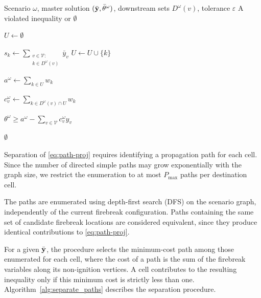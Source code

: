 \documentclass[a4paper,fleqn]{cas-sc}
\begin{document}
\begin{algorithm}[h]
\caption{Separation of \eqref{eq:coverage_projected}}
\label{alg:separate_coverage}
\begin{algorithmic}[1]
\Require Scenario $\omega$, master solution
$(\bar{\vb{y}},\bar\theta^\omega)$,
downstream sets $D^\omega(v)$, tolerance $\varepsilon$
\Ensure A violated inequality or $\emptyset$

\State $U\gets\emptyset$

    \State $s_k\gets
    \displaystyle\sum_{\substack{v\in\mathcal V:\\
    k\in D^\omega(v)}}\bar y_v$
        \State $U\gets U\cup\{k\}$
    \EndIf
\EndFor

\State $a^\omega\gets\displaystyle\sum_{k\in U}w_k$

    \State $c_v^\omega\gets
    \displaystyle\sum_{k\in D^\omega(v)\cap U}w_k$
\EndFor

    \State \Return
    $\displaystyle\theta^\omega\geq
    a^\omega-\sum_{v\in\mathcal V}c_v^\omega y_v$
\EndIf

\State \Return $\emptyset$
\end{algorithmic}
\end{algorithm}


Separation of \eqref{eq:path-proj} requires identifying a
propagation path for each cell. Since the number of directed
simple paths may grow exponentially with the graph size,
we restrict the enumeration to at most $P_{\max}$ paths per
destination cell.

The paths are enumerated using depth-first search (DFS)
on the scenario graph, independently of the current
firebreak configuration. Paths containing the same set
of candidate firebreak locations are considered equivalent,
since they produce identical contributions to
\eqref{eq:path-proj}.

For a given $\bar{\vb{y}}$, the procedure selects the
minimum-cost path among those enumerated for each cell,
where the cost of a path is the sum of the firebreak
variables along its non-ignition vertices.
A cell contributes to the resulting inequality only if
this minimum cost is strictly less than one. Algorithm~\ref{alg:separate_paths} describes the separation
procedure.
\end{document}
